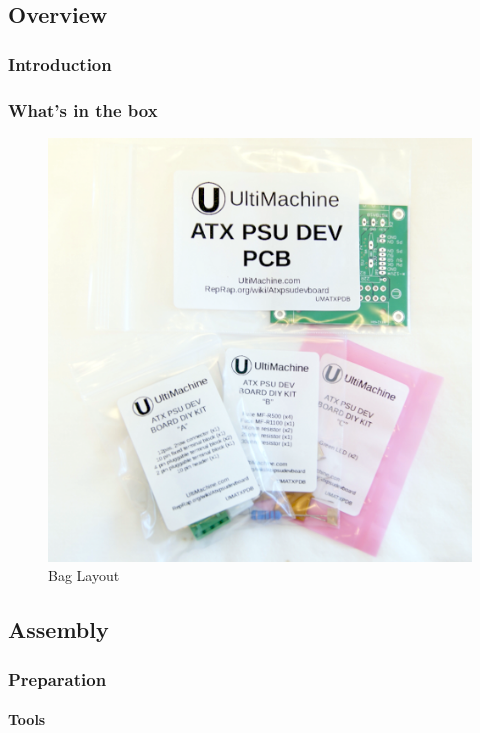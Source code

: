 \subsection{Overview}

\subsubsection{Introduction}

\subsubsection{What's in the box}

\begin{figure}[htbp]
\centering
\includegraphics{./png/ATX_PSU_Dev_DIYkit.png}
\caption{Bag Layout}
\end{figure}

\subsection{Assembly}

\subsubsection{Preparation}

\paragraph{Tools}

